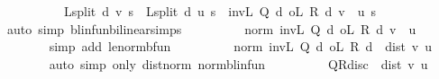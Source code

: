 \begin{isabellebody}
\ \ \isamarkupfalse%
\ {\isacharminus}{\kern0pt}\isanewline
\ \ \ \ \isamarkupfalse%
\ {\isachardoublequoteopen}L{\isacharunderscore}{\kern0pt}split\ d\ v\ s\ {\isacharminus}{\kern0pt}\ L{\isacharunderscore}{\kern0pt}split\ d\ u\ s\ {\isacharequal}{\kern0pt}\ {\isacharparenleft}{\kern0pt}inv\isactrlsub L\ {\isacharparenleft}{\kern0pt}Q\ d{\isacharparenright}{\kern0pt}\ o\isactrlsub L\ {\isacharparenleft}{\kern0pt}R\ d{\isacharparenright}{\kern0pt}{\isacharparenright}{\kern0pt}\ {\isacharparenleft}{\kern0pt}v\ {\isacharminus}{\kern0pt}\ u{\isacharparenright}{\kern0pt}\ s{\isachardoublequoteclose}\isanewline
\ \ \ \ \ \ \isamarkupfalse%
\ {\isacharparenleft}{\kern0pt}auto\ simp{\isacharcolon}{\kern0pt}\ blinfun{\isachardot}{\kern0pt}bilinear{\isacharunderscore}{\kern0pt}simps{\isacharparenright}{\kern0pt}\isanewline
\ \ \ \ \isamarkupfalse%
\ \isamarkupfalse%
\ {\isachardoublequoteopen}{\isasymdots}\ {\isasymle}\ norm\ {\isacharparenleft}{\kern0pt}{\isacharparenleft}{\kern0pt}inv\isactrlsub L\ {\isacharparenleft}{\kern0pt}Q\ d{\isacharparenright}{\kern0pt}\ o\isactrlsub L\ {\isacharparenleft}{\kern0pt}R\ d{\isacharparenright}{\kern0pt}{\isacharparenright}{\kern0pt}\ {\isacharparenleft}{\kern0pt}v\ {\isacharminus}{\kern0pt}\ u{\isacharparenright}{\kern0pt}{\isacharparenright}{\kern0pt}{\isachardoublequoteclose}\isanewline
\ \ \ \ \ \ \isamarkupfalse%
\ {\isacharparenleft}{\kern0pt}simp\ add{\isacharcolon}{\kern0pt}\ le{\isacharunderscore}{\kern0pt}norm{\isacharunderscore}{\kern0pt}bfun{\isacharparenright}{\kern0pt}\isanewline
\ \ \ \ \isamarkupfalse%
\ \isamarkupfalse%
\ {\isachardoublequoteopen}{\isasymdots}\ {\isasymle}\ norm\ {\isacharparenleft}{\kern0pt}{\isacharparenleft}{\kern0pt}inv\isactrlsub L\ {\isacharparenleft}{\kern0pt}Q\ d{\isacharparenright}{\kern0pt}\ o\isactrlsub L\ {\isacharparenleft}{\kern0pt}R\ d{\isacharparenright}{\kern0pt}{\isacharparenright}{\kern0pt}{\isacharparenright}{\kern0pt}\ {\isacharasterisk}{\kern0pt}\ dist\ v\ u{\isachardoublequoteclose}\isanewline
\ \ \ \ \ \ \isamarkupfalse%
\ {\isacharparenleft}{\kern0pt}auto\ simp\ only{\isacharcolon}{\kern0pt}\ dist{\isacharunderscore}{\kern0pt}norm\ norm{\isacharunderscore}{\kern0pt}blinfun{\isacharparenright}{\kern0pt}\isanewline
\ \ \ \ \isamarkupfalse%
\ \isamarkupfalse%
\ {\isachardoublequoteopen}{\isasymdots}\ {\isasymle}\ QR{\isacharunderscore}{\kern0pt}disc\ {\isacharasterisk}{\kern0pt}\ dist\ v\ u{\isachardoublequoteclose}\isanewline

\end{isabellebody}
